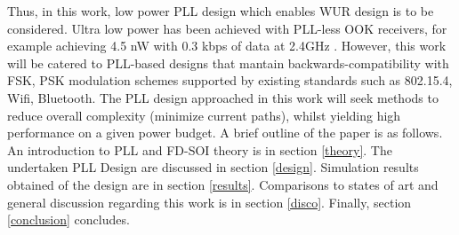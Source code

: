 Thus, in this work, low power PLL design which enables WUR design is to be considered. Ultra low power has been achieved with PLL-less OOK receivers, for example achieving 4.5 nW with 0.3 kbps of data at 2.4GHz \cite{Jiang2017}. However, this work will be catered to PLL-based designs that mantain backwards-compatibility with FSK, PSK modulation schemes supported by existing standards such as 802.15.4, Wifi, Bluetooth. The PLL design approached in this work will seek methods to reduce overall complexity (minimize current paths), whilst yielding high performance on a given power budget. A brief outline of the paper is as follows. An introduction to PLL and FD-SOI theory is in section \ref{theory}. The undertaken PLL Design are discussed in section \ref{design}. Simulation results obtained of the design are in section \ref{results}. Comparisons to states of art and general discussion regarding this work is in section \ref{disco}. Finally, section \ref{conclusion} concludes. 
%
%
%
%
